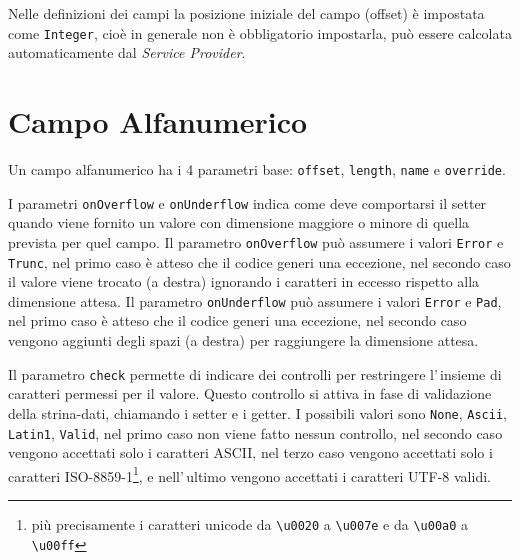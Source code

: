 \documentclass[a4paper,10pt]{report}
\begin{document}
Nelle definizioni dei campi la posizione iniziale del campo (offset) è impostata 
come \texttt{Integer}, cioè in generale non è obbligatorio impostarla, può 
essere calcolata automaticamente dal \textsl{Service Provider}.

\section{Campo Alfanumerico}
Un campo alfanumerico ha i 4 parametri base: \verb!offset!, \verb!length!,
\verb!name! e \verb!override!.

I parametri \verb!onOverflow! e \verb!onUnderflow! indica come deve comportarsi
il setter quando viene fornito un valore con dimensione maggiore o minore di
quella prevista per quel campo.
Il parametro \hypertarget{abc:ovf}{\texttt{onOverflow}} può assumere i valori 
\verb!Error! e \verb!Trunc!, nel primo caso è atteso che il codice generi una 
eccezione, nel secondo caso il valore viene trocato (a destra) ignorando i 
caratteri in eccesso rispetto alla dimensione attesa.
Il parametro \hypertarget{abc:unf}{\texttt{onUnderflow}} può assumere i valori 
\verb!Error! e \verb!Pad!, nel primo caso è atteso che il codice generi una 
eccezione, nel secondo caso vengono aggiunti degli spazi (a destra) per 
raggiungere la dimensione attesa.

Il parametro \hypertarget{abc:chk}{\texttt{check}} permette di indicare dei 
controlli per restringere l'\,insieme di caratteri permessi per il valore. 
Questo controllo si attiva in fase di validazione della strina-dati, chiamando 
i setter e i getter.
I possibili valori sono \verb!None!, \verb!Ascii!, \verb!Latin1!, \verb!Valid!,
nel primo caso non viene fatto nessun controllo, nel secondo caso vengono 
accettati solo i caratteri ASCII, nel terzo caso vengono accettati solo i 
caratteri ISO-8859-1\footnote{più precisamente i caratteri unicode da 
\texttt{\textbackslash u0020} a \texttt{\textbackslash u007e} e 
da \texttt{\textbackslash u00a0} a \texttt{\textbackslash u00ff}}, e 
nell'\,ultimo vengono accettati i caratteri UTF-8 validi.
\end{document}
